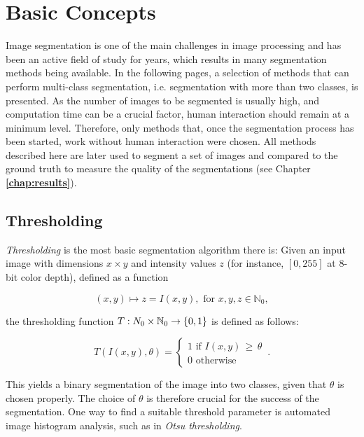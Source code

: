 \chapter{Basic Concepts}
\label{chap:concepts}

Image segmentation is one of the main challenges in image processing and has been an active field of study for years, which results in many segmentation methods being available. In the following pages, a selection of methods that can perform multi-class segmentation, i.e. segmentation with more than two classes, is presented. As the number of images to be segmented is usually high, and computation time can be a crucial factor, human interaction should remain at a minimum level. Therefore, only methods that, once the segmentation process has been started, work without human interaction were chosen. All methods described here are later used to segment a set of images and compared to the ground truth to measure the quality of the segmentations (see Chapter \textbf{\ref{chap:results}}).
	
	\section{Thresholding}
\label{sec:thresholding}

\textit{Thresholding} \cite[ff. 82]{machine_vision} is the most basic segmentation algorithm there is: Given an input image with dimensions $x \times y$ and intensity values $z$ (for instance, $[0, 255]$ at 8-bit color depth), defined as a function

\[(x, y) \mapsto z = I(x, y), \text{ for } x, y, z \in \mathbb{N}_0,\]

\noindent the thresholding function $T: \mathbb \mathbb{N}_0 \times \mathbb{N}_0 \rightarrow \{0, 1\}$ is defined as follows:

\[ T(I(x, y), \theta) =  \begin{cases}
				1 \text{ if } I(x, y) \, \geq \, \theta \\
			           0 \text{ otherwise}
			     \end{cases}\,.
\]

\noindent This yields a binary segmentation of the image into two classes, given that $\theta$ is chosen properly. The choice of $\theta$ is therefore crucial for the success of the segmentation. One way to find a suitable threshold parameter is automated image histogram analysis, such as in \textit{Otsu thresholding}.\\

